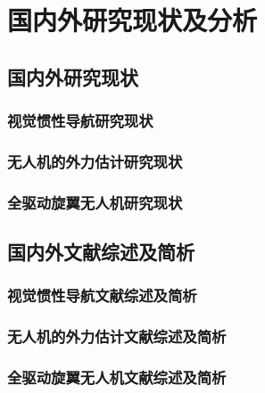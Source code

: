 \section{国内外研究现状及分析}
\subsection{国内外研究现状}
\subsubsection{视觉惯性导航研究现状}
\subsubsection{无人机的外力估计研究现状}
\subsubsection{全驱动旋翼无人机研究现状}
\subsection{国内外文献综述及简析}
\subsubsection{视觉惯性导航文献综述及简析}
\subsubsection{无人机的外力估计文献综述及简析}
\subsubsection{全驱动旋翼无人机文献综述及简析}